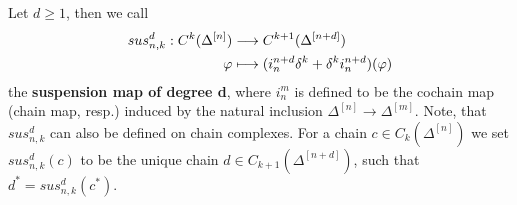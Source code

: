 \begin{defi}
Let \(d\geq 1\), then we call
\begin{align}
sus_{n,k}^d:C^k(\Delta^{[n]})&\longrightarrow C^{k+1}(\Delta^{[n+d]})\notag\\
\varphi&\longmapsto (i_n^{n+d}\delta^k+\delta^ki_n^{n+d})(\varphi)\notag
\end{align}
the \textbf{suspension map of degree d}, where \(i_n^m\) is defined to be the cochain map (chain map, resp.) induced by the natural inclusion \(\Delta^{[n]}\rightarrow\Delta^{[m]}\).
Note, that \(sus_{n,k}^d\) can also be defined on chain complexes. For a chain \(c\in C_k(\Delta^{[n]})\) we set \(sus_{n,k}^d(c)\) to be the unique chain \(d\in C_{k+1}(\Delta^{[n+d]})\), such that \(d^*=sus_{n,k}^d(c^*)\).
\end{defi}

